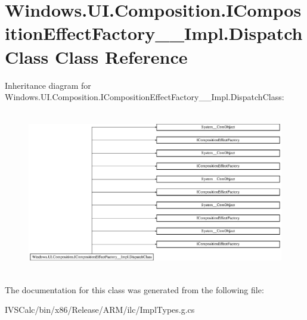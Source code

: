 \hypertarget{class_windows_1_1_u_i_1_1_composition_1_1_i_composition_effect_factory_____impl_1_1_dispatch_class}{}\section{Windows.\+U\+I.\+Composition.\+I\+Composition\+Effect\+Factory\+\_\+\+\_\+\+Impl.\+Dispatch\+Class Class Reference}
\label{class_windows_1_1_u_i_1_1_composition_1_1_i_composition_effect_factory_____impl_1_1_dispatch_class}
Inheritance diagram for Windows.\+U\+I.\+Composition.\+I\+Composition\+Effect\+Factory\+\_\+\+\_\+\+Impl.\+Dispatch\+Class\+:\begin{figure}[H]
\begin{center}
\leavevmode
\includegraphics[height=7.179487cm]{class_windows_1_1_u_i_1_1_composition_1_1_i_composition_effect_factory_____impl_1_1_dispatch_class}
\end{center}
\end{figure}


The documentation for this class was generated from the following file\+:\begin{DoxyCompactItemize}
\item 
I\+V\+S\+Calc/bin/x86/\+Release/\+A\+R\+M/ilc/Impl\+Types.\+g.\+cs\end{DoxyCompactItemize}
